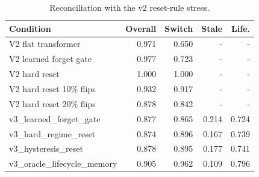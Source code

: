 \begin{table}[t]
\centering
\caption{Reconciliation with the v2 reset-rule stress.}
\label{tab:v2-reconciliation}
\small
\begin{tabular}{lrrrr}
\toprule
Condition & Overall & Switch & Stale & Life. \\
\midrule
V2 flat transformer & 0.971 & 0.650 & - & - \\
V2 learned forget gate & 0.977 & 0.723 & - & - \\
V2 hard reset & 1.000 & 1.000 & - & - \\
V2 hard reset 10\% flips & 0.932 & 0.917 & - & - \\
V2 hard reset 20\% flips & 0.878 & 0.842 & - & - \\
v3\_learned\_forget\_gate & 0.877 & 0.865 & 0.214 & 0.724 \\
v3\_hard\_regime\_reset & 0.874 & 0.896 & 0.167 & 0.739 \\
v3\_hysteresis\_reset & 0.878 & 0.895 & 0.177 & 0.741 \\
v3\_oracle\_lifecycle\_memory & 0.905 & 0.962 & 0.109 & 0.796 \\
\bottomrule
\end{tabular}
\end{table}
